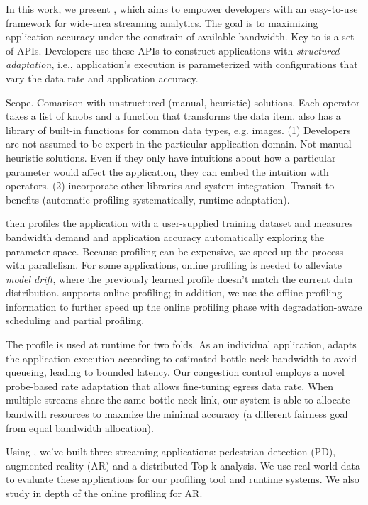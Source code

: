 In this work, we present \sysname{}, which aims to empower developers with an
easy-to-use framework for wide-area streaming analytics. The goal is to
maximizing application accuracy under the constrain of available bandwidth. Key
to \sysname{} is a set of \maybe{} APIs. Developers use these APIs to construct
applications with \textit{structured adaptation}, i.e., application's execution
is parameterized with configurations that vary the data rate and application
accuracy.

Scope. Comarison with unstructured (manual, heuristic) solutions. Each \maybe{}
operator takes a list of knobs and a function that transforms the data
item. \sysname{} also has a library of built-in functions for common data types,
e.g. images. (1) Developers are not assumed to be expert in the particular
application domain. Not manual heuristic solutions. Even if they only have
intuitions about how a particular parameter would affect the application, they
can embed the intuition with \maybe{} operators. (2) incorporate other libraries
and system integration. Transit to benefits (automatic profiling systematically,
runtime adaptation).

\sysname{} then profiles the application with a user-supplied training dataset
and measures bandwidth demand and application accuracy automatically exploring
the parameter space. Because profiling can be expensive, we speed up the process
with parallelism. For some applications, online profiling is needed to alleviate
\textit{model drift}, where the previously learned profile doesn't match the
current data distribution. \sysname{} supports online profiling; in addition, we
use the offline profiling information to further speed up the online profiling
phase with degradation-aware scheduling and partial profiling.

The profile is used at runtime for two folds. As an individual application,
\sysname{} adapts the application execution according to estimated bottle-neck
bandwidth to avoid queueing, leading to bounded latency. Our congestion control
employs a novel probe-based rate adaptation that allows fine-tuning egress data
rate. When multiple streams share the same bottle-neck link, our system is able
to allocate bandwith resources to maxmize the minimal accuracy (a different
fairness goal from equal bandwidth allocation).

Using \sysname{}, we've built three streaming applications: pedestrian detection
(PD), augmented reality (AR) and a distributed Top-k analysis. We use real-world
data to evaluate these applications for our profiling tool and runtime
systems. We also study in depth of the online profiling for AR.

